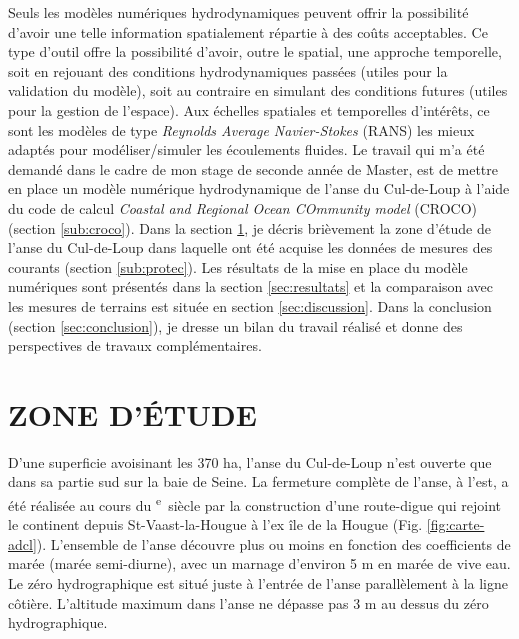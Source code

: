 \documentclass[10pt,a4paper,titlepage]{article}
\def\siecle#1{\textsc{\romannumeral #1}\textsuperscript{e}~siècle}
\begin{document}
Seuls les modèles numériques hydrodynamiques peuvent offrir la possibilité d'avoir une telle information spatialement répartie à des coûts acceptables. Ce type d'outil offre la possibilité d'avoir, outre le spatial, une approche temporelle, soit en rejouant des conditions hydrodynamiques passées (utiles pour la validation du modèle), soit au contraire en simulant des conditions futures (utiles pour la gestion de l'espace). Aux échelles spatiales et temporelles d'intérêts, ce sont les modèles de type \textit{Reynolds Average Navier-Stokes} (RANS) les mieux adaptés pour modéliser/simuler les écoulements fluides.
Le travail qui m'a été demandé dans le cadre de mon stage de seconde année de Master, est de mettre en place un modèle numérique hydrodynamique de l'anse du Cul-de-Loup à l'aide du code de calcul \textit{Coastal and Regional Ocean COmmunity model} (CROCO) (section \ref{sub:croco}). Dans la section \ref{sec:adcl}, je décris brièvement la zone d'étude de l'anse du Cul-de-Loup dans laquelle ont été acquise les données de mesures des courants (section \ref{sub:protec}). Les résultats de la mise en place du modèle numériques sont présentés dans la section \ref{sec:resultats} et la comparaison avec les mesures de terrains est située en section \ref{sec:discussion}. Dans la conclusion (section \ref{sec:conclusion}), je dresse un bilan du travail réalisé et donne des perspectives de travaux complémentaires.

\newpage

\section{ZONE D'ÉTUDE}
\label{sec:adcl}


D'une superficie avoisinant les 370 ha, l'anse du Cul-de-Loup n'est ouverte que dans sa partie sud sur la baie de Seine. La fermeture complète de l'anse, à l'est, a été réalisée au cours du \siecle{17} par la construction d'une route-digue qui rejoint le continent depuis St-Vaast-la-Hougue à l'ex île de la Hougue (Fig. \ref{fig:carte-adcl}). L'ensemble de l'anse découvre plus ou moins en fonction des coefficients de marée (marée semi-diurne), avec un marnage d'environ 5 m en marée de vive eau. Le zéro hydrographique est situé juste à l'entrée de l'anse parallèlement à la ligne côtière. L'altitude maximum dans l'anse ne dépasse pas 3 m au dessus du zéro hydrographique.
\end{document}
